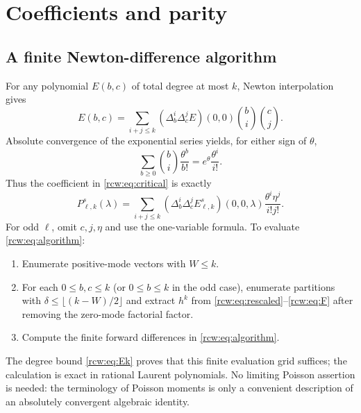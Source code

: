 \documentclass[11pt]{article}
\theoremstyle{definition}\newtheorem{definition}[theorem]{Definition}
\theoremstyle{remark}\newtheorem{remark}[theorem]{Remark}
\numberwithin{equation}{section}
\begin{document}
\section{Coefficients and parity}\label{rcw:sec:coefficients}
\subsection{A finite Newton-difference algorithm}
For any polynomial $E(b,c)$ of total degree at most $k$, Newton interpolation gives
\[
 E(b,c)=\sum_{i+j\le k}(\Delta_b^i\Delta_c^jE)(0,0)
                         \binom bi\binom cj.
\]
Absolute convergence of the exponential series yields, for either sign of $\theta$,
\[
 \sum_{b\ge0}\binom bi\frac{\theta^b}{b!}
       =e^\theta\frac{\theta^i}{i!}.
\]
Thus the coefficient in \eqref{rcw:eq:critical} is exactly
\begin{equation}\label{rcw:eq:algorithm}
 P^s_{\ell,k}(\lambda)=
 \sum_{i+j\le k}(\Delta_b^i\Delta_c^jE^s_{\ell,k})(0,0,\lambda)
                    \frac{\theta^i\eta^j}{i!j!}.
\end{equation}
For odd $\ell$, omit $c,j,\eta$ and use the one-variable formula. To evaluate \eqref{rcw:eq:algorithm}:
\begin{enumerate}
\item Enumerate positive-mode vectors with $W\le k$.
\item For each $0\le b,c\le k$ (or $0\le b\le k$ in the odd case), enumerate partitions with $\delta\le\lfloor(k-W)/2\rfloor$ and extract $h^k$ from \eqref{rcw:eq:rescaled}--\eqref{rcw:eq:F} after removing the zero-mode factorial factor.
\item Compute the finite forward differences in \eqref{rcw:eq:algorithm}.
\end{enumerate}
The degree bound \eqref{rcw:eq:Ek} proves that this finite evaluation grid suffices; the calculation is exact in rational Laurent polynomials. No limiting Poisson assertion is needed: the terminology of Poisson moments is only a convenient description of an absolutely convergent algebraic identity.
\end{document}
